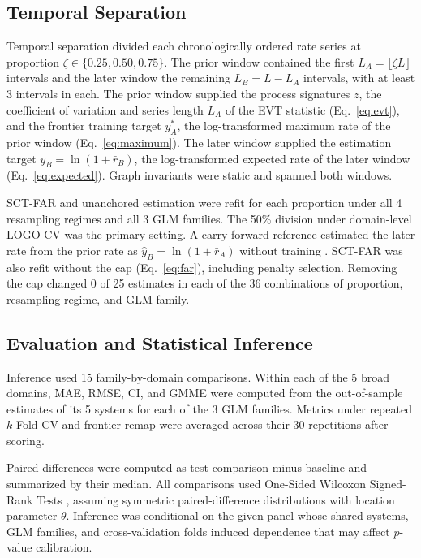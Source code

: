 \documentclass{article}
\begin{document}
\subsection*{Temporal Separation}
\label{sec:temporal}
Temporal separation divided each chronologically ordered rate series at proportion $\zeta \in \{0.25, 0.50, 0.75\}$. The prior window contained the first $L_A = \lfloor \zeta L \rfloor$ intervals and the later window the remaining $L_B = L - L_A$ intervals, with at least 3 intervals in each. The prior window supplied the process signatures $z$, the coefficient of variation and series length $L_A$ of the EVT statistic (Eq.~\eqref{eq:evt}), and the frontier training target $y_A^{*}$, the log-transformed maximum rate of the prior window (Eq.~\eqref{eq:maximum}). The later window supplied the estimation target $y_B = \ln(1 + \bar{r}_B)$, the log-transformed expected rate of the later window (Eq.~\eqref{eq:expected}). Graph invariants were static and spanned both windows.

SCT-FAR and unanchored estimation were refit for each proportion under all 4 resampling regimes and all 3 GLM families. The 50\% division under domain-level LOGO-CV was the primary setting. A carry-forward reference estimated the later rate from the prior rate as $\widehat{y}_B = \ln(1 + \bar{r}_A)$ without training \citep{ref148}. SCT-FAR was also refit without the cap (Eq.~\eqref{eq:far}), including penalty selection. Removing the cap changed 0 of 25 estimates in each of the 36 combinations of proportion, resampling regime, and GLM family.

\subsection*{Evaluation and Statistical Inference}
\label{sec:inference}
Inference used 15 family-by-domain comparisons. Within each of the 5 broad domains, MAE, RMSE, CI, and GMME were computed from the out-of-sample estimates of its 5 systems for each of the 3 GLM families. Metrics under repeated $k$-Fold-CV and frontier remap were averaged across their 30 repetitions after scoring.

Paired differences were computed as test comparison minus baseline and summarized by their median. All comparisons used One-Sided Wilcoxon Signed-Rank Tests \citep{ref45}, assuming symmetric paired-difference distributions with location parameter $\theta$. Inference was conditional on the given panel whose shared systems, GLM families, and cross-validation folds induced dependence that may affect $p$-value calibration.
\end{document}
